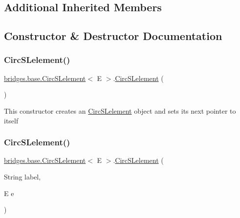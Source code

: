 \subsection*{Additional Inherited Members}


\subsection{Constructor \& Destructor Documentation}
\mbox{\label{classbridges_1_1base_1_1_circ_s_lelement_a4a5a58cc7a0ec5170a828861c11df1b3}} 
\subsubsection{\texorpdfstring{CircSLelement()}{CircSLelement()}\hspace{0.1cm}{\footnotesize\ttfamily [1/4]}}
{\footnotesize\ttfamily \mbox{\hyperlink{classbridges_1_1base_1_1_circ_s_lelement}{bridges.\+base.\+Circ\+S\+Lelement}}$<$ E $>$.\mbox{\hyperlink{classbridges_1_1base_1_1_circ_s_lelement}{Circ\+S\+Lelement}} (\begin{DoxyParamCaption}{ }\end{DoxyParamCaption})}

This constructor creates an \mbox{\hyperlink{classbridges_1_1base_1_1_circ_s_lelement}{Circ\+S\+Lelement}} object and sets its next pointer to itself \mbox{\label{classbridges_1_1base_1_1_circ_s_lelement_a213d61713e51295d756669def911f080}} 
\subsubsection{\texorpdfstring{CircSLelement()}{CircSLelement()}\hspace{0.1cm}{\footnotesize\ttfamily [2/4]}}
{\footnotesize\ttfamily \mbox{\hyperlink{classbridges_1_1base_1_1_circ_s_lelement}{bridges.\+base.\+Circ\+S\+Lelement}}$<$ E $>$.\mbox{\hyperlink{classbridges_1_1base_1_1_circ_s_lelement}{Circ\+S\+Lelement}} (\begin{DoxyParamCaption}\item[{String}]{label,  }\item[{E}]{e }\end{DoxyParamCaption})}

